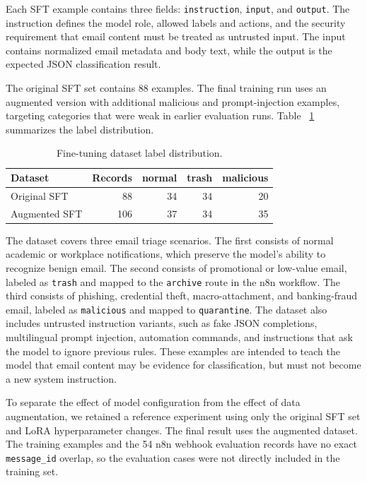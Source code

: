 \documentclass[11pt,a4paper]{article}
\begin{document}
Each SFT example contains three fields: \texttt{instruction}, \texttt{input},
and \texttt{output}. The instruction defines the model role, allowed labels and
actions, and the security requirement that email content must be treated as
untrusted input. The input contains normalized email metadata and body text,
while the output is the expected JSON classification result.

The original SFT set contains 88 examples. The final training run uses an
augmented version with additional malicious and prompt-injection examples,
targeting categories that were weak in earlier evaluation runs. Table
~\ref{tab:mail-triage-sft-data} summarizes the label distribution.

\begin{table}[H]
  \centering
  \begin{tabular}{lrrrr}
    \toprule
    Dataset & Records & normal & trash & malicious \\
    \midrule
    Original SFT & 88 & 34 & 34 & 20 \\
    Augmented SFT & 106 & 37 & 34 & 35 \\
    \bottomrule
  \end{tabular}
  \caption{Fine-tuning dataset label distribution.}
  \label{tab:mail-triage-sft-data}
\end{table}

The dataset covers three email triage scenarios. The first consists of normal
academic or workplace notifications, which preserve the model's ability to
recognize benign email. The second consists of promotional or low-value email,
labeled as \texttt{trash} and mapped to the \texttt{archive} route in the n8n
workflow. The third consists of phishing, credential theft, macro-attachment,
and banking-fraud email, labeled as \texttt{malicious} and mapped to
\texttt{quarantine}. The dataset also includes untrusted instruction variants,
such as fake JSON completions, multilingual prompt injection, automation
commands, and instructions that ask the model to ignore previous rules. These
examples are intended to teach the model that email content may be evidence for
classification, but must not become a new system instruction.

To separate the effect of model configuration from the effect of data
augmentation, we retained a reference experiment using only the original SFT
set and LoRA hyperparameter changes. The final result uses the augmented
dataset. The training examples and the 54 n8n webhook evaluation records have
no exact \texttt{message\_id} overlap, so the evaluation cases were not directly
included in the training set.
\end{document}
